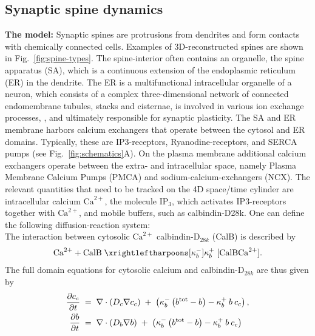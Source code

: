 \subsection{Synaptic spine dynamics} \label{sec:spine-model}
\textbf{The model:} Synaptic spines are protrusions from dendrites and form contacts with chemically connected cells. Examples of 3D-reconstructed spines are shown in Fig.~\ref{fig:spine-types}. The spine-interior often contains an organelle, the spine apparatus (SA), which is a continuous extension of the endoplasmic reticulum (ER) in the dendrite. The ER is a multifunctional intracellular organelle of a neuron,
which consists of a complex three-dimensional network of connected endomembrane
tubules, stacks and cisternae, is involved in various ion exchange processes,
\cite{Breit2018}, and ultimately responsible for synaptic plasticity. The SA and ER membrane harbors calcium exchangers that operate between the cytosol and ER domains. Typically, these are IP3-receptors, Ryanodine-receptors, and SERCA pumps (see Fig.~\ref{fig:schematics}A). On the plasma membrane additional calcium exchangers operate between the extra- and intracellular space, namely Plasma Membrane Calcium Pumps (PMCA) and sodium-calcium-exchangers (NCX). 
The relevant quantities that need to be tracked on the 4D space/time cylinder are intracellular calcium $\textrm{Ca}^{2+}$, the molecule $\textrm{IP}_3$, which activates IP3-receptors together with $\textrm{Ca}^{2+}$, and mobile buffers, such as calbindin-D28k. One can define the following diffusion-reaction system: \\
The interaction between cytosolic $\textrm{Ca}^{2+}$ calbindin-$\textrm{D}_{28k}$ (CalB) is described by
\begin{align}
  \mathrm{Ca}^{2+}+\mathrm{CalB}\;\xrightleftharpoons
  [\kappa_{b}^{-}]{\kappa_{b}^{+}}\;[\mathrm{CalBCa}^{2+}].
\end{align}
\noindent The full domain equations for cytosolic calcium and calbindin-$\textrm{D}_{28k}$ are thus given by
\begin{align}
  \frac{\partial c_c}{\partial t} & \;=\; \nabla \cdot \left( D_{c} \nabla c_c \right) \;+\;
    \left(\kappa_{b}^{-}\left(b^{\mathrm{tot}}-b\right)
        -\kappa_{b}^{+}\:b\:c_c\right), \label{eq:ccyt}\\
  \frac{\partial b}{\partial t} & \;=\; \nabla \cdot \left( D_{b} \nabla b \right) \;+\;
    \left(\kappa_{b}^{-}\left(b^{\mathrm{tot}}-b\right)
        -\kappa_{b}^{+}\:b\:c_c\right)  \label{eq:buff}
\end{align}
